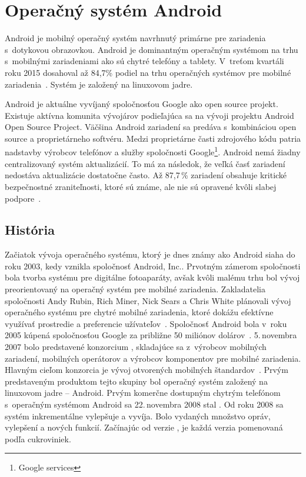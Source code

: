 \chapter{Operačný systém Android}
Android je mobilný operačný systém navrhnutý primárne pre zariadenia s~dotykovou obrazovkou. Android je dominantným operačným systémom na trhu s~mobilnými zariadeniami ako sú chytré telefóny a tablety. V~treťom kvartáli roku 2015 dosahoval až 84,7\% podiel na trhu operačných systémov pre mobilné zariadenia~\cite{Westenberg2015}. Systém je založený na linuxovom jadre.

Android je aktuálne vyvíjaný spoločnosťou Google ako open source projekt. Existuje aktívna komunita vývojárov podieľajúca sa na vývoji projektu Android Open Source Project. Väčšina Android zariadení sa predáva s~kombináciou open source a proprietárneho softvéru. Medzi proprietárne časti zdrojového kódu patria nadstavby výrobcov telefónov a služby spoločnosti Google\footnote{Google services}. Android nemá žiadny centralizovaný systém aktualizácií. To má za následok, že veľká časť zariadení nedostáva aktualizácie dostatočne často. Až 87,7\,\% zariadení obsahuje kritické bezpečnostné zraniteľnosti, ktoré sú známe, ale nie sú opravené kvôli slabej podpore~\cite{Thomas2015}.


\section{História}
Začiatok vývoja operačného systému, ktorý je dnes známy ako Android siaha do roku 2003, kedy vznikla spoločnosť Android, Inc.. Prvotným zámerom spoločnosti bola tvorba systému pre digitálne fotoaparáty, avšak kvôli malému trhu bol vývoj preorientovaný na operačný systém pre mobilné zariadenia. Zakladatelia spoločnosti Andy Rubin, Rich Miner, Nick Sears  a Chris White plánovali vývoj operačného systému pre chytré mobilné zariadenia, ktoré dokážu efektívne využívať prostredie a preferencie užívateľov~\cite{Beavis2008}. Spoločnosť Android bola v~roku 2005 kúpená spoločnosťou Google za približne 50 miliónov dolárov~\cite{Rosoff2011}. 5.\,novembra 2007 bolo predstavené konzorcium , skladajúce sa z~výrobcov mobilných zariadení, mobilných operátorov a výrobcov komponentov pre mobilné zariadenia. Hlavným cieľom konzorcia je vývoj otvorených mobilných štandardov~\cite{OHA}. Prvým predstaveným produktom tejto skupiny bol operačný systém založený na linuxovom jadre -- Android. Prvým komerčne dostupným chytrým telefónom s~operačným systémom Android sa 22.\,novembra 2008 stal . Od roku 2008 sa systém inkrementálne vylepšuje a vyvíja. Bolo vydaných množstvo opráv, vylepšení a nových funkcií. Začínajúc od verzie , je každá verzia pomenovaná podľa cukroviniek.

